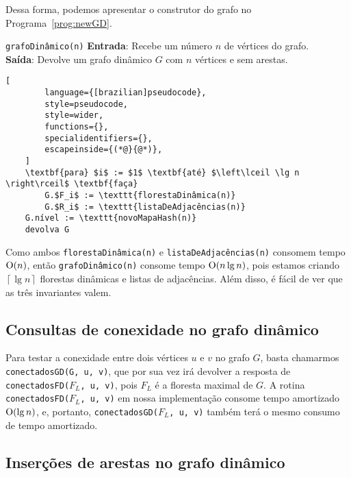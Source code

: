 Dessa forma, podemos apresentar o construtor do grafo no Programa~\ref{prog:newGD}. 

\begin{programruledcaption}{\texttt{grafoDinâmico(n)} \label{prog:newGD}}
    \noindent\textbf{Entrada}: Recebe um número $n$ de vértices do grafo. \\
    \textbf{Saída}: Devolve um grafo dinâmico $G$ com $n$ vértices e sem arestas.
    \vspace{-0.5\baselineskip}
    \begin{lstlisting}[
        language={[brazilian]pseudocode},
        style=pseudocode,
        style=wider,
        functions={},
        specialidentifiers={},
        escapeinside={(*@}{@*)},
    ]
    \textbf{para} $i$ := $1$ \textbf{até} $\left\lceil \lg n \right\rceil$ \textbf{faça}
        G.$F_i$ := \texttt{florestaDinâmica(n)}
        G.$R_i$ := \texttt{listaDeAdjacências(n)}
    G.nível := \texttt{novoMapaHash(n)}
    devolva G
    \end{lstlisting}
    \vspace{-0.5\baselineskip}
\end{programruledcaption}

Como ambos \texttt{florestaDinâmica(n)} e \texttt{listaDeAdjacências(n)} consomem tempo $\mathrm{O}(n)$, então \texttt{grafoDinâmico(n)} consome tempo $\mathrm{O}(n \lg n)$, pois estamos criando $\left\lceil \lg n \right\rceil$ florestas dinâmicas e listas de adjacências. Além disso, é fácil de ver que as três invariantes valem.

\subsection{Consultas de conexidade no grafo dinâmico}
\label{sec:dynamic-graph-connectivity-queries}

Para testar a conexidade entre dois vértices $u$ e $v$ no grafo $G$, basta chamarmos \texttt{conectadosGD(G, u, v)}, que por sua vez irá devolver a resposta de \texttt{conectadosFD($F_L$, u, v)}, pois $F_L$ é a floresta maximal de $G$. A rotina \texttt{conectadosFD($F_L$, u, v)} em nossa implementação consome tempo amortizado $\mathrm{O}(\lg n)$, e, portanto, \texttt{conectadosGD($F_L$, u, v)} também terá o mesmo consumo de tempo amortizado.

\subsection{Inserções de arestas no grafo dinâmico}

